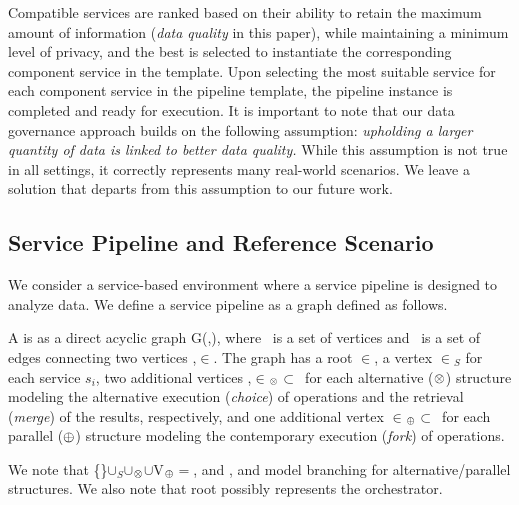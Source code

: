 Compatible services are ranked based on their ability to retain the maximum amount of information (\emph{data quality} in this paper), while maintaining a minimum level of privacy, and the best is selected to instantiate the corresponding component service in the template.
Upon selecting the most suitable service for each component service in the pipeline template, the pipeline instance is completed and ready for execution.
It is important to note that our data governance approach builds on the following assumption: \emph{upholding a larger quantity of data is linked to better data quality.}
While this assumption is not true in all settings, it correctly represents many real-world scenarios. We leave a solution that departs from this assumption to our future work.

\subsection{Service Pipeline and Reference Scenario}\label{sec:service_definition}
We consider a service-based environment where a service pipeline is designed to analyze data.
We define a service pipeline as a graph defined as follows. %
\begin{definition}[\pipeline]\label{def:pipeline}
  A \pipeline is as a direct acyclic graph G(\V,\E), where \V\ is a set of vertices and \E\ is a set of edges connecting two vertices ,$\in$\V.
  The graph has a root $\in$\V, a vertex $\in$\V$_S$ for each service $s_i$, two additional vertices ,$\in$\V$_{\otimes}$$\subset$\V\ for each alternative ($\otimes$) structure modeling the alternative execution (\emph{choice}) of operations and the retrieval (\emph{merge}) of the results, respectively,
        and one additional vertex  $\in$\V$_{\oplus}$$\subset$\V\ for each parallel ($\oplus$) structure modeling the contemporary execution (\emph{fork}) of operations.
\end{definition}

We note that \{\}$\cup$\V$_S$$\cup$\V$_{\otimes}$$\cup$V$_{\oplus}$$=$\V, and ,  and  model branching for alternative/parallel structures.
We also note that root  possibly represents the orchestrator.

